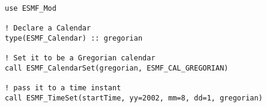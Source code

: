 
\begin{verbatim}
use ESMF_Mod

! Declare a Calendar
type(ESMF_Calendar) :: gregorian

! Set it to be a Gregorian calendar
call ESMF_CalendarSet(gregorian, ESMF_CAL_GREGORIAN)

! pass it to a time instant
call ESMF_TimeSet(startTime, yy=2002, mm=8, dd=1, gregorian)
\end{verbatim}
